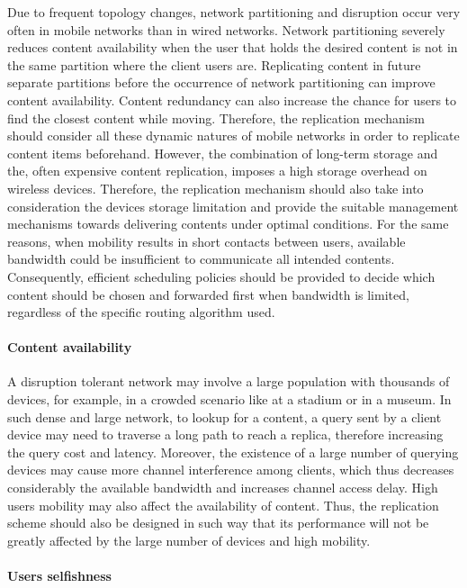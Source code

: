 Due to frequent topology changes, network partitioning and disruption occur very often in mobile networks than in wired networks. Network partitioning severely reduces content availability when the user that holds the desired content is not in the same partition where the client users are. Replicating content
in future separate partitions before the occurrence of network partitioning can improve content availability. Content redundancy can also increase the chance for users to find the
closest content while moving. Therefore, the replication mechanism should consider all these dynamic natures of mobile networks in order to replicate content items beforehand. However, the combination of long-term storage and the, often expensive content replication, imposes a high storage overhead on wireless devices. Therefore, the replication mechanism should also take into consideration the devices storage limitation and provide the suitable management mechanisms towards delivering contents under optimal conditions. For the same reasons, when mobility results in short contacts between users, available bandwidth could be insufficient to communicate all intended contents. Consequently, efficient scheduling policies should be provided to decide which content should be chosen and forwarded first when bandwidth is limited, regardless of the specific routing algorithm used.

\paragraph{Content availability}

A disruption tolerant network may involve a large population with thousands of devices, for example, in a crowded scenario like at a stadium or in a museum. In such dense and
large network, to lookup for a content, a query sent by a client device may need to traverse a long path to reach a replica, therefore increasing the query cost and latency. Moreover, the
existence of a large number of querying devices may cause more channel interference among clients, which thus decreases considerably the available bandwidth and increases channel
access delay. High users mobility may also affect the availability of content. Thus, the replication scheme should also be designed in such way that its performance will not be greatly affected by the large number of devices and high mobility.

\paragraph{Users selfishness}

